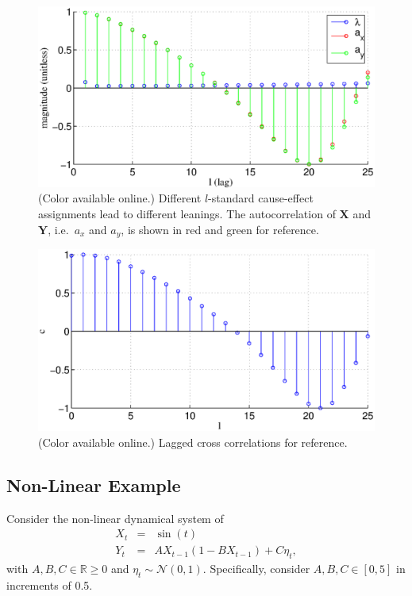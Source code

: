 \documentclass[a4paper,11pt,twocolumn]{article}
\begin{document}
\begin{figure}[ht]
\includegraphics[scale=0.45]{SimpleCyclicexample_difflags.eps}
\caption{(Color available online.) Different $l$-standard cause-effect assignments lead to different leanings.  The autocorrelation of $\mathbf{X}$ and $\mathbf{Y}$, i.e.\ $a_x$ and $a_y$, is shown in red and green for reference.}
\end{figure}
\begin{figure}[ht]
\includegraphics[scale=0.45]{SimpleCyclicexample_lagcorr.eps}
\caption{(Color available online.) Lagged cross correlations for reference.}
\end{figure}


\subsection{Non-Linear Example}
Consider the non-linear dynamical system of
\begin{eqnarray}
\label{eqn:nonlinearEX}
X_t &=& \sin(t)\\
Y_t &=& AX_{t-1}\left(1-BX_{t-1}\right)+C\eta_t,
\end{eqnarray}
with $A,B,C\in\mathbb{R}\ge 0$ and $\eta_t\sim\mathcal{N}\left(0,1\right)$.  Specifically, consider $A,B,C\in[0,5]$ in increments of 0.5.  
\end{document}
